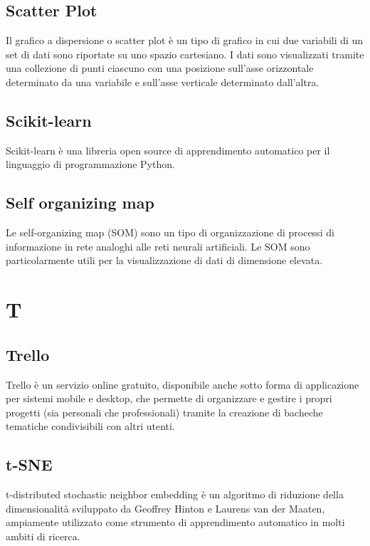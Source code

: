 \subsection{Scatter Plot}
Il grafico a dispersione o scatter plot è un tipo di grafico in cui due variabili di un set di dati sono riportate su uno spazio cartesiano.
I dati sono visualizzati tramite una collezione di punti ciascuno con una posizione sull'asse orizzontale determinato da una variabile e sull'asse verticale determinato dall'altra. 

\subsection{Scikit-learn}
Scikit-learn è una libreria open source di apprendimento automatico per il linguaggio di programmazione Python.

\subsection{Self organizing map}
Le self-organizing map (SOM) sono un tipo di organizzazione di processi di informazione in rete analoghi alle reti neurali artificiali. Le SOM sono particolarmente utili per la visualizzazione di dati di dimensione elevata.

\newpage
\section{T}
\subsection{Trello}
Trello è un servizio online gratuito, disponibile anche sotto forma di applicazione per sistemi mobile e desktop, che permette di organizzare e gestire i propri progetti (sia personali che professionali) tramite la creazione di bacheche tematiche condivisibili con altri utenti.

\subsection{t-SNE}
t-distributed stochastic neighbor embedding è un algoritmo di riduzione della dimensionalità sviluppato da Geoffrey Hinton e Laurens van der Maaten, ampiamente utilizzato come strumento di apprendimento automatico in molti ambiti di ricerca.

\newpage

